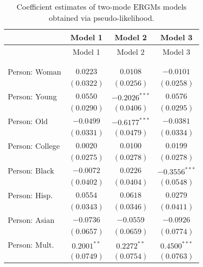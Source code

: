 
\begin{center}
\begin{longtable}{l c c c}
\toprule
 & Model 1 & Model 2 & Model 3 \\
\midrule
\endfirsthead
\toprule
 & Model 1 & Model 2 & Model 3 \\
\midrule
\endhead
\bottomrule
\endfoot
\bottomrule
\multicolumn{4}{l}{\scriptsize{$^{***}p<0.001$; $^{**}p<0.01$; $^{*}p<0.05$}}\\
\caption{Coefficient estimates of two-mode ERGMs models obtained via pseudo-likelihood.}
\label{tab:reg2}
\endlastfoot \\
Person: Woman              & $0.0223$       & $0.0108$        & $-0.0101$       \\
                           & $(0.0322)$     & $(0.0256)$      & $(0.0258)$      \\
Person: Young              & $0.0550$       & $-0.2026^{***}$ & $0.0576$        \\
                           & $(0.0290)$     & $(0.0406)$      & $(0.0295)$      \\
Person: Old                & $-0.0499$      & $-0.6177^{***}$ & $-0.0381$       \\
                           & $(0.0331)$     & $(0.0479)$      & $(0.0334)$      \\
Person: College            & $0.0020$       & $0.0100$        & $0.0199$        \\
                           & $(0.0275)$     & $(0.0278)$      & $(0.0278)$      \\
Person: Black              & $-0.0072$      & $0.0226$        & $-0.3556^{***}$ \\
                           & $(0.0402)$     & $(0.0404)$      & $(0.0548)$      \\
Person: Hisp.              & $0.0554$       & $0.0618$        & $0.0279$        \\
                           & $(0.0343)$     & $(0.0346)$      & $(0.0411)$      \\
Person: Asian              & $-0.0736$      & $-0.0559$       & $-0.0926$       \\
                           & $(0.0657)$     & $(0.0659)$      & $(0.0774)$      \\
Person: Mult.              & $0.2001^{**}$  & $0.2272^{**}$   & $0.4500^{***}$  \\
                           & $(0.0749)$     & $(0.0754)$      & $(0.0763)$      \\

\end{longtable}
\end{center}
